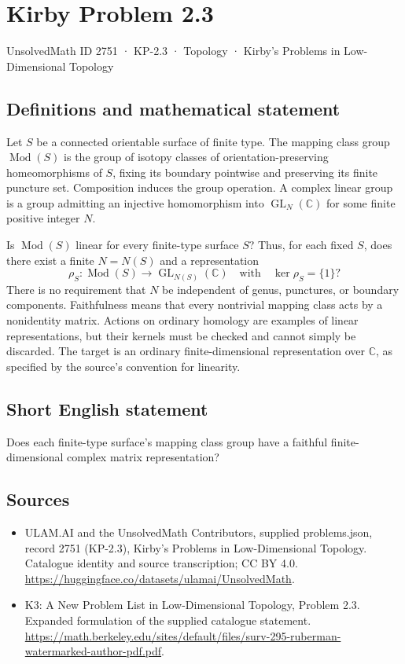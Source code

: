 \documentclass[11pt,a4paper]{article}
\begin{document}
\section*{Kirby Problem 2.3}\label{2751}
{\small UnsolvedMath ID 2751 · KP-2.3 · Topology · Kirby's Problems in Low-Dimensional Topology}
\subsection{Definitions and mathematical statement}
Let $S$ be a connected orientable surface of finite type. The mapping class
group $\operatorname{Mod}(S)$ is the group of isotopy classes of
orientation-preserving homeomorphisms of $S$, fixing its boundary pointwise and
preserving its finite puncture set. Composition induces the group operation.
A complex linear group is a group admitting an injective homomorphism into
$\operatorname{GL}_N(\mathbb C)$ for some finite positive integer $N$.

Is $\operatorname{Mod}(S)$ linear for every finite-type surface $S$? Thus, for
each fixed $S$, does there exist a finite $N=N(S)$ and a representation
\[
\rho_S:\operatorname{Mod}(S)\longrightarrow\operatorname{GL}_{N(S)}(\mathbb C)
\quad\text{with}\quad\ker\rho_S=\{1\}?
\]
There is no requirement that $N$ be independent of genus, punctures, or boundary
components. Faithfulness means that every nontrivial mapping class acts by a
nonidentity matrix. Actions on ordinary homology are examples of linear
representations, but their kernels must be checked and cannot simply be
discarded. The target is an ordinary finite-dimensional representation over
$\mathbb C$, as specified by the source's convention for linearity.
\subsection{Short English statement}
Does each finite-type surface's mapping class group have a faithful finite-dimensional complex matrix representation?
\subsection{Sources}
\begin{itemize}
\item[S1] ULAM.AI and the UnsolvedMath Contributors, supplied problems.json, record 2751 (KP-2.3), Kirby's Problems in Low-Dimensional Topology. Catalogue identity and source transcription; CC BY 4.0.
\url{https://huggingface.co/datasets/ulamai/UnsolvedMath}.
\item[S2] K3: A New Problem List in Low-Dimensional Topology, Problem 2.3. Expanded formulation of the supplied catalogue statement.
\url{https://math.berkeley.edu/sites/default/files/surv-295-ruberman-watermarked-author-pdf.pdf}.
\end{itemize}
\end{document}
